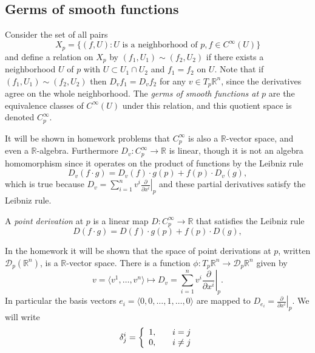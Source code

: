\subsection{Germs of smooth functions}

\begin{defn}
Consider the set of all pairs
$$
  X_p
= \{ (f, U) : U \text{ is a neighborhood of } p,
              f \in C^\infty (U)
  \}
$$
and define a relation on $X_p$ by
$(f_1, U_1) \sim (f_2, U_2)$ if there exists a neighborhood $U$ of $p$
with $U \subset U_1 \cap U_2$ and $f_1 = f_2$ on $U$. Note that if
$(f_1, U_1) \sim (f_2, U_2)$ then $D_v f_1 = D_v f_2$ for any
$v \in T_p \mathbb{R}^n$, since the derivatives agree on the whole
neighborhood. The \emph{germs of smooth functions at $p$} are the
equivalence classes of $C^\infty(U)$ under this relation, and this
quotient space is denoted $C_p^\infty$.
\end{defn}

It will be shown in homework problems that $C_p^\infty$ is also a
$\mathbb{R}$-vector space, and even a
$\mathbb{R}$-algebra. Furthermore $D_v : C_p^\infty \to \mathbb{R}$ is
linear, though it is not an algebra homomorphism since it operates on
the product of functions by the Leibniz rule
$$
  D_v (f \cdot g)
= D_v (f) \cdot g(p)
+ f(p) \cdot D_v (g),
$$
which is true because
$  D_v
 = \sum_{i=1}^n
     v^i
     \left.
       \frac{\partial}{\partial x^i}
     \right|_p
$ and these partial derivatives satisfy the Leibniz rule.

\begin{defn}[Derivation]
A \emph{point derivation} at $p$ is a linear map
$D : C_p^\infty \to \mathbb{R}$ that satisfies the Leibniz rule
$$
D (f \cdot g) = D(f) \cdot g(p) + f(p) \cdot D(g),
$$
\end{defn}

In the homework it will be shown that the space of point derivations
at $p$, written $\mathcal{D}_p(\mathbb{R}^n)$, is a
$\mathbb{R}$-vector space. There is a function
$\phi: T_p \mathbb{R}^n \to \mathcal{D}_p \mathbb{R}^n$ given by
$$
        v
      = \langle v^1, \dots, v^n \rangle
\mapsto D_v
      = \sum_{i=1}^n
          v^i
          \left. \frac{\partial}{\partial x^i}\right|_p.
$$
In particular the basis vectors
$e_i = \langle 0, 0, \dots, 1, \dots, 0 \rangle$ are mapped to
$D_{e_i} = \left.\frac{\partial}{\partial x^i}\right|_p$. We will
write
$$
  \delta^i_j
= \left\{
    \begin{array}{l c}
      1, & \quad i = j \\
      0, & \quad i \neq j
    \end{array}
  \right.
$$

